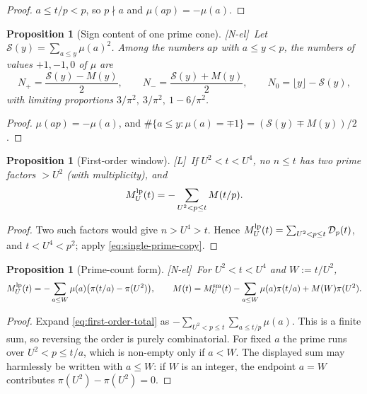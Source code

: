 \documentclass[11pt,reqno]{amsart}
\numberwithin{equation}{section}
\theoremstyle{plain}
\newtheorem{proposition}[theorem]{Proposition}
\theoremstyle{definition}
\theoremstyle{remark}
\newcommand{\Sq}{\mathcal{S}}
\newcommand{\tagNE}{\textup{[N-el]}}
\newcommand{\tagL}{\textup{[L]}}
\begin{document}
\begin{proof}
$a\le t/p<p$, so $p\nmid a$ and $\mu(ap)=-\mu(a)$.
\end{proof}

\begin{proposition}[Sign content of one prime cone]
\label{prop:prime-cone-signs}
\tagNE\ Let $\Sq(y)=\sum_{a\le y}\mu(a)^2$. Among the numbers $ap$ with $a\le y<p$,
the numbers of values $+1,-1,0$ of $\mu$ are
\begin{equation}
\label{eq:cone_counts}
  N_+=\frac{\Sq(y)-M(y)}{2},\qquad N_-=\frac{\Sq(y)+M(y)}{2},\qquad
  N_0=\lfloor y\rfloor-\Sq(y),
\end{equation}
with limiting proportions $3/\pi^2,\ 3/\pi^2,\ 1-6/\pi^2$.
\end{proposition}

\begin{proof}
$\mu(ap)=-\mu(a)$, and $\#\{a\le y:\mu(a)=\mp1\}=(\Sq(y)\mp M(y))/2$.
\end{proof}

\begin{proposition}[First-order window]
\label{prop:linear-new-primes}
\tagL\ If $U^2<t<U^4$, no $n\le t$ has two prime factors $>U^2$ (with
multiplicity), and
\begin{equation}
\label{eq:first-order-total}
  M^{\rm lp}_U(t)=-\sum_{U^2<p\le t}M(t/p).
\end{equation}
\end{proposition}

\begin{proof}
Two such factors would give $n>U^4>t$. Hence $M^{\rm lp}_U(t)=\sum_{U^2<p\le t}
\mathcal D_p(t)$, and $t<U^4<p^2$; apply \eqref{eq:single-prime-copy}.
\end{proof}

\begin{proposition}[Prime-count form]
\label{prop:prime_count_form}
\tagNE\ For $U^2<t<U^4$ and $W:=t/U^2$,
\begin{equation}
\label{eq:prime_count_form}
  M^{\rm lp}_U(t)=-\sum_{a\le W}\mu(a)\bigl(\pi(t/a)-\pi(U^2)\bigr),
  \qquad
  M(t)=M^{\rm sm}_U(t)-\sum_{a\le W}\mu(a)\pi(t/a)+M(W)\pi(U^2).
\end{equation}
\end{proposition}

\begin{proof}
Expand \eqref{eq:first-order-total} as
$-\sum_{U^2<p\le t}\sum_{a\le t/p}\mu(a)$.  This is a finite sum, so
reversing the order is purely combinatorial.  For fixed $a$ the prime runs
over $U^2<p\le t/a$, which is non-empty only if $a<W$.  The displayed sum
may harmlessly be written with $a\le W$: if $W$ is an integer, the endpoint
$a=W$ contributes $\pi(U^2)-\pi(U^2)=0$.
\end{proof}
\end{document}
